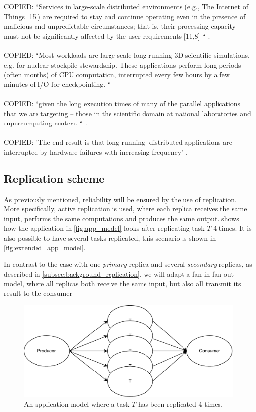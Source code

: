 \documentclass{cslthse-msc}
\begin{document}
COPIED:
“Services in large-scale distributed environments (e.g., The Internet of Things [15]) are required to stay and continue operating even in the presence of malicious and unpredictable circumstances; that is, their processing capacity must not be significantly affected by the user requirements [11,8] “ \cite{imprRelAdaptRL}.
\\\\
COPIED: “Most workloads are large-scale long-running 3D scientific simulations, e.g. for nuclear stockpile stewardship. These applications perform long periods (often months) of CPU computation, interrupted every few hours by a few minutes of I/O for checkpointing. “ \cite{studyOfFailures}
\\\\
COPIED: “given the long execution times of many of the parallel applications that we are targeting – those in the scientific domain at national laboratories and supercomputing centers. “ \cite{implicationsOfFailures}. 
\\\\
COPIED: "The end result is that long-running, distributed applications are interrupted by hardware failures with increasing frequency" \cite{surveyFaultParallel}.

\fi

\subsection{Replication scheme} \label{subsec:design_repl_scheme}
As previously mentioned, reliability will be ensured by the use of replication. More specifically, active replication is used, where each replica receives the same input, performs the same computations and produces the same output.  shows how the application in \cref{fig:app_model} looks after replicating task $T$ 4 times. It is also possible to have several tasks replicated, this scenario is shown in \cref{fig:extended_app_model}.

In contrast to the case with one \emph{primary} replica and several \emph{secondary} replicas, as described in \cref{subsec:background_replication}, we will adapt a fan-in fan-out model, where all replicas both receive the same input, but also all transmit its result to the consumer.

\begin{figure}[!hbt]
\centering
\includegraphics[scale=0.5]{images/app_model_replication.pdf} 
\caption{An application model where a task $T$ has been replicated 4 times.}\label{fig:app_model_replication}
\end{figure}
\end{document}
